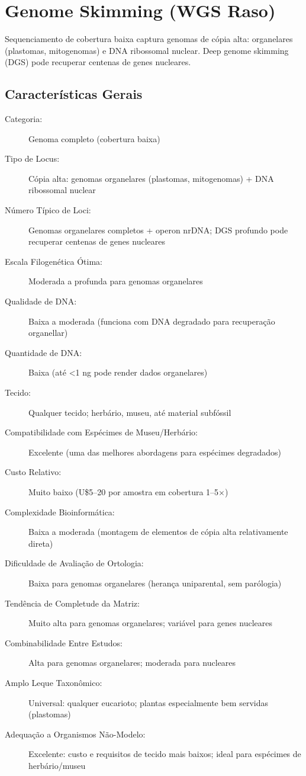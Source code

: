 \textcite{baird2008, peterson2012, eaton2020, huang2016}

\section{Genome Skimming (WGS Raso)}

Sequenciamento de cobertura baixa captura genomas de cópia alta: organelares (plastomas, mitogenomas) e DNA ribossomal nuclear. Deep genome skimming (DGS) pode recuperar centenas de genes nucleares.

\subsection{Características Gerais}

\begin{description}
\item[Categoria:] Genoma completo (cobertura baixa)
\item[Tipo de Locus:] Cópia alta: genomas organelares (plastomas, mitogenomas) + DNA ribossomal nuclear
\item[Número Típico de Loci:] Genomas organelares completos + operon nrDNA; DGS profundo pode recuperar centenas de genes nucleares
\item[Escala Filogenética Ótima:] Moderada a profunda para genomas organelares
\item[Qualidade de DNA:] Baixa a moderada (funciona com DNA degradado para recuperação organellar)
\item[Quantidade de DNA:] Baixa (até <1 ng pode render dados organelares)
\item[Tecido:] Qualquer tecido; herbário, museu, até material subfóssil
\item[Compatibilidade com Espécimes de Museu/Herbário:] Excelente (uma das melhores abordagens para espécimes degradados)
\item[Custo Relativo:] Muito baixo (U\$5--20 por amostra em cobertura 1--5$\times$)
\item[Complexidade Bioinformática:] Baixa a moderada (montagem de elementos de cópia alta relativamente direta)
\item[Dificuldade de Avaliação de Ortologia:] Baixa para genomas organelares (herança uniparental, sem parólogia)
\item[Tendência de Completude da Matriz:] Muito alta para genomas organelares; variável para genes nucleares
\item[Combinabilidade Entre Estudos:] Alta para genomas organelares; moderada para nucleares
\item[Amplo Leque Taxonômico:] Universal: qualquer eucarioto; plantas especialmente bem servidas (plastomas)
\item[Adequação a Organismos Não-Modelo:] Excelente: custo e requisitos de tecido mais baixos; ideal para espécimes de herbário/museu
\end{description}

